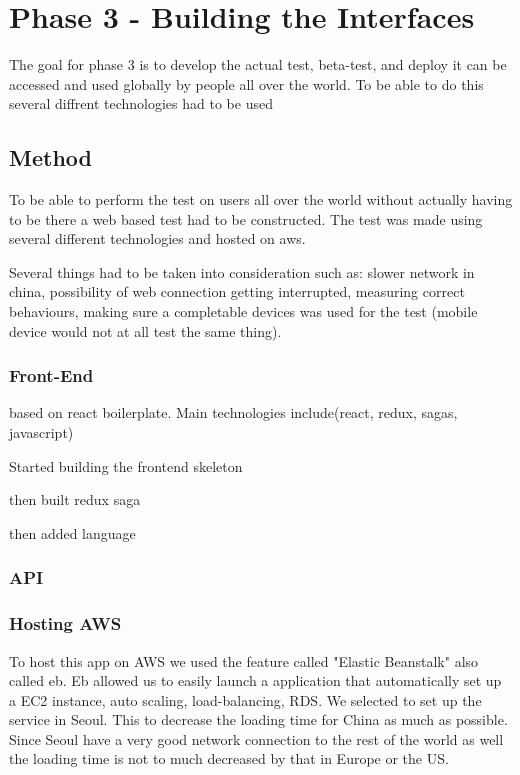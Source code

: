 
\chapter{Phase 3 - Building the Interfaces} %

\label{Chapter6} %

The goal for phase 3 is to develop the actual test, beta-test, and deploy it can be accessed and used globally by people all over the world. To be able to do this several diffrent technologies had to be used
\section{Method}
To be able to perform the test on users all over the world without actually having to be there a web based test had to be constructed. The test was made using several different technologies and hosted on aws. 

Several things had to be taken into consideration such as: slower network in china, possibility of web connection getting interrupted, measuring correct behaviours, making sure a completable devices was used for the test (mobile device would not at all test the same thing).


\subsection{Front-End}
based on react boilerplate. Main technologies include(react, redux, sagas, javascript)

Started building the frontend skeleton

then built redux saga

then added language


\subsection{API}

\subsection{Hosting AWS}
To host this app on AWS we used the feature called "Elastic Beanstalk" also called eb. Eb allowed us to easily launch a application that automatically set up a EC2 instance, auto scaling, load-balancing, RDS. We selected to set up the service in Seoul. This to decrease the loading time for China as much as possible. Since Seoul have a very good network connection to the rest of the world as well the loading time is not to much decreased by that in Europe or the US.

